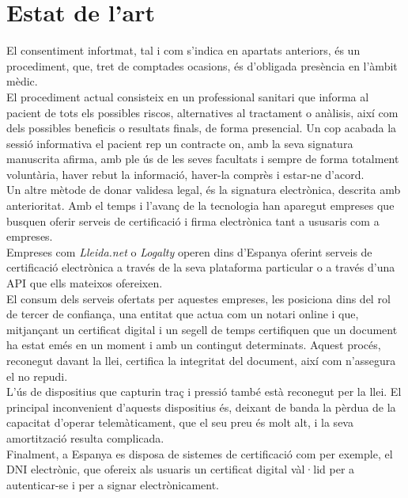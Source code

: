 \section{Estat de l'art}
El consentiment infortmat, tal i com s'indica en apartats anteriors, és un procediment, que, tret de comptades ocasions, és d'obligada presència en l'àmbit mèdic.\\
\newline El procediment actual consisteix en un professional sanitari que informa al pacient de tots els possibles riscos, alternatives al tractament o anàlisis, així com dels possibles beneficis o resultats finals, de forma presencial. Un cop acabada la sessió informativa el pacient rep un contracte on, amb la seva signatura manuscrita afirma, amb ple ús de les seves facultats i sempre de forma totalment voluntària, haver rebut la informació, haver-la comprès i estar-ne d'acord.\\
\newline Un altre mètode de donar validesa legal, és la signatura electrònica, descrita amb anterioritat. Amb el temps i l'avanç de la tecnologia han aparegut empreses que busquen oferir serveis de certificació i firma electrònica tant a ususaris com a empreses.\\
\newline Empreses com \textit{Lleida.net}\cite{lleidanet} o \textit{Logalty}\cite{logalty} operen dins d'Espanya oferint serveis de certificació electrònica a través de la seva plataforma particular o a través d'una API que ells mateixos ofereixen.\\
\newline El consum dels serveis ofertats per aquestes empreses, les posiciona dins del rol de tercer de confiança, una entitat que actua com un notari online i que, mitjançant un certificat digital i un segell de temps certifiquen que un document ha estat emés en un moment i amb un contingut determinats. 
\newline Aquest procés, reconegut davant la llei, certifica la integritat del document, així com n'assegura el no repudi.\\
\newline L'ús de dispositius que capturin traç i pressió també està reconegut per la llei. El principal inconvenient d'aquests dispositius és, deixant de banda la pèrdua de la capacitat d'operar telemàticament, que el seu preu és molt alt, i la seva amortització resulta complicada.\\
\newline Finalment, a Espanya es disposa de sistemes de certificació com per exemple, el DNI electrònic, que ofereix als usuaris un certificat digital vàl·lid per a autenticar-se i per a signar electrònicament.
